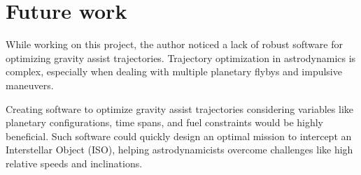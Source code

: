 \section{Future work}

While working on this project, the author noticed a lack of robust software for
optimizing gravity assist trajectories. Trajectory optimization in astrodynamics
is complex, especially when dealing with multiple planetary flybys and impulsive
maneuvers.

Creating software to optimize gravity assist trajectories considering variables
like planetary configurations, time spans, and fuel constraints would be highly
beneficial. Such software could quickly design an optimal mission to intercept an
Interstellar Object (ISO), helping astrodynamicists overcome challenges like
high relative speeds and inclinations.
